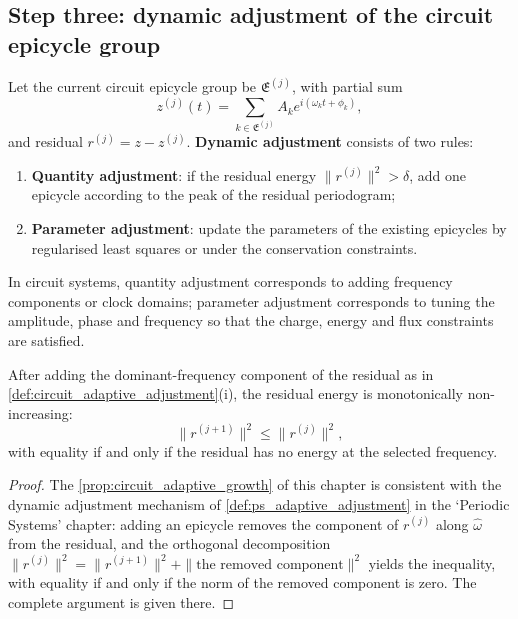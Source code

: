\subsection{Step three: dynamic adjustment of the circuit epicycle group}

\begin{definition}\label{def:circuit_adaptive_adjustment}
Let the current circuit epicycle group be $\mathfrak E^{(j)}$, with partial sum
\[
z^{(j)}(t)=\sum_{k\in\mathfrak E^{(j)}}A_k e^{i(\omega_k t+\phi_k)},
\]
and residual $r^{(j)}=z-z^{(j)}$. \textbf{Dynamic adjustment} consists of two rules:
\begin{enumerate}[label=(\roman*)]
    \item \textbf{Quantity adjustment}: if the residual energy $\|r^{(j)}\|^2>\delta$, add one epicycle according to the peak of the residual periodogram;
    \item \textbf{Parameter adjustment}: update the parameters of the existing epicycles by regularised least squares or under the conservation constraints.
\end{enumerate}
In circuit systems, quantity adjustment corresponds to adding frequency components or clock domains; parameter adjustment corresponds to tuning the amplitude, phase and frequency so that the charge, energy and flux constraints are satisfied.
\end{definition}

\begin{proposition}\label{prop:circuit_adaptive_growth}
After adding the dominant-frequency component of the residual as in \cref{def:circuit_adaptive_adjustment}(i), the residual energy is monotonically non-increasing:
\[
\|r^{(j+1)}\|^2\le\|r^{(j)}\|^2,
\]
with equality if and only if the residual has no energy at the selected frequency.
\end{proposition}

\begin{proof}
The \cref{prop:circuit_adaptive_growth} of this chapter is consistent with the dynamic adjustment mechanism of \cref{def:ps_adaptive_adjustment} in the `Periodic Systems' chapter:
adding an epicycle removes the component of $r^{(j)}$ along $\hat\omega$ from the residual, and the orthogonal decomposition
$\|r^{(j)}\|^2=\|r^{(j+1)}\|^2+\|\text{the removed component}\|^2$ yields the inequality,
with equality if and only if the norm of the removed component is zero. The complete argument is given there.
\end{proof}

